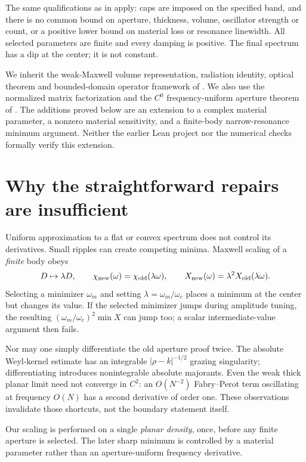 \documentclass[11pt]{article}
\newcommand{\abs}[1]{\left|#1\right|}
\begin{document}
The same qualifications as in \cite{strict} apply: caps are imposed on the
specified band, and there is no common bound on aperture, thickness, volume,
oscillator strength or count, or a positive lower bound on material loss or
resonance linewidth. All selected parameters are finite and every damping is
positive. The final spectrum has a dip at the center; it is not constant.

We inherit the weak-Maxwell volume representation, radiation identity,
optical theorem and bounded-domain operator framework of \cite{base}.
We also use the normalized matrix factorization and the $C^0$ frequency-uniform
aperture theorem of \cite{strict}. The additions proved below are an extension
to a complex material parameter, a nonzero material sensitivity, and a
finite-body narrow-resonance minimum argument. Neither the earlier Lean
project nor the numerical checks formally verify this extension.

\section{Why the straightforward repairs are insufficient}
Uniform approximation to a flat or convex spectrum does not control its
derivatives. Small ripples can create competing minima. Maxwell scaling of a
\emph{finite} body obeys
\[
 D\mapsto\lambda D,\qquad
 \chi_{\rm new}(\omega)=\chi_{\rm old}(\lambda\omega),\qquad
 X_{\rm new}(\omega)=\lambda^2X_{\rm old}(\lambda\omega).
\]
Selecting a minimizer $\omega_m$ and setting $\lambda=\omega_m/\omega_c$
places a minimum at the center but changes its value. If the selected
minimizer jumps during amplitude tuning, the resulting
$(\omega_m/\omega_c)^2\min X$ can jump too; a scalar intermediate-value
argument then fails.

Nor may one simply differentiate the old aperture proof twice.
The absolute Weyl-kernel estimate has an integrable
$\abs{\rho-k}^{-1/2}$ grazing singularity; differentiating introduces
nonintegrable absolute majorants. Even the weak thick planar limit need not
converge in $C^2$: an $O(N^{-2})$ Fabry--Perot term oscillating at frequency
$O(N)$ has a second derivative of order one. These observations invalidate
those shortcuts, not the boundary statement itself.

Our scaling is performed on a single \emph{planar density}, once, before
any finite aperture is selected. The later sharp minimum is controlled by a
material parameter rather than an aperture-uniform frequency derivative.
\end{document}
